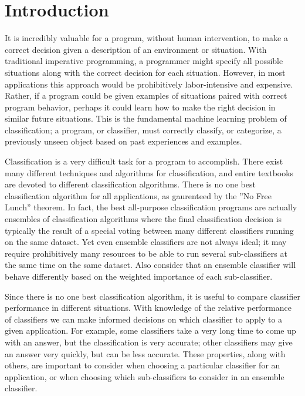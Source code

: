 \documentclass[12pt, letterpaper]{article}
\begin{document}
\section{Introduction}
It is incredibly valuable for a program, without human intervention, to make a 
correct decision given a description of an environment or situation. With 
traditional imperative programming, a programmer might specify all
possible situations along with the correct decision for each situation. 
However, in most applications this approach would be prohibitively labor-intensive
and expensive.  Rather, if a program could be given examples of 
situations paired with correct program behavior, perhaps it could learn 
how to make the right decision in similar future situations. This is the fundamental
machine learning problem of classification; a program, or classifier, must correctly classify, or categorize, 
a previously unseen object based on past experiences and examples.

Classification is a very difficult task for a program to accomplish.  There exist
many different techniques and algorithms for classification, and entire textbooks
are devoted to different classification algorithms\cite{ML_Mitchell}.  There is no
one best classification algorithm for all applications, as gaurenteed by the 
''No Free Lunch'' theorem\cite{noFreeLunch}.  In fact, the best all-purpose classification
programs are actually ensembles of classification algorithms where the final
classification decision is typically the result of a special voting between
many different classifiers running on the same dataset\cite{Opitz_Ensemble}.
Yet even ensemble classifiers are not always ideal; it may require prohibitively many resources
to be able to run several sub-classifiers at the same time on the same dataset. Also consider
that an ensemble classifier will behave differently based on the 
weighted importance of each sub-classifier\cite{Dynamic_Classifier}. 

Since there is no one best classification algorithm\cite{noFreeLunch}, it is useful to compare
classifier performance in different situations.  With knowledge of the relative
performance of classifiers we can make informed decisions on which classifier to 
apply to a given application.  For example, some classifiers take a very long time 
to come up with an answer, but the classification is very accurate; other classifiers may give
an answer very quickly, but can be less accurate.  These properties, along with others, are
important to consider when choosing a particular classifier for an application, or 
when choosing which sub-classifiers to consider in an ensemble classifier\cite{Dynamic_Classifier}.
\end{document}
